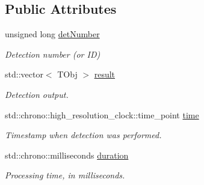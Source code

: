 \subsection*{Public Attributes}
\begin{DoxyCompactItemize}
\item 
\hypertarget{struct_vision_core_1_1_abstractions_1_1_detection_data_a73f468ab2fffab197d80d2e02abe86ac}{}unsigned long \hyperlink{struct_vision_core_1_1_abstractions_1_1_detection_data_a73f468ab2fffab197d80d2e02abe86ac}{det\+Number}\label{struct_vision_core_1_1_abstractions_1_1_detection_data_a73f468ab2fffab197d80d2e02abe86ac}

\begin{DoxyCompactList}\small\item\em Detection number (or I\+D) \end{DoxyCompactList}\item 
\hypertarget{struct_vision_core_1_1_abstractions_1_1_detection_data_ab01e2839a0bcd471d80ef46063083993}{}std\+::vector$<$ T\+Obj $>$ \hyperlink{struct_vision_core_1_1_abstractions_1_1_detection_data_ab01e2839a0bcd471d80ef46063083993}{result}\label{struct_vision_core_1_1_abstractions_1_1_detection_data_ab01e2839a0bcd471d80ef46063083993}

\begin{DoxyCompactList}\small\item\em Detection output. \end{DoxyCompactList}\item 
\hypertarget{struct_vision_core_1_1_abstractions_1_1_detection_data_af19c07021635b43df099e62283c93341}{}std\+::chrono\+::high\+\_\+resolution\+\_\+clock\+::time\+\_\+point \hyperlink{struct_vision_core_1_1_abstractions_1_1_detection_data_af19c07021635b43df099e62283c93341}{time}\label{struct_vision_core_1_1_abstractions_1_1_detection_data_af19c07021635b43df099e62283c93341}

\begin{DoxyCompactList}\small\item\em Timestamp when detection was performed. \end{DoxyCompactList}\item 
\hypertarget{struct_vision_core_1_1_abstractions_1_1_detection_data_a9c26a1638f116d3c0fba3f9342d67af1}{}std\+::chrono\+::milliseconds \hyperlink{struct_vision_core_1_1_abstractions_1_1_detection_data_a9c26a1638f116d3c0fba3f9342d67af1}{duration}\label{struct_vision_core_1_1_abstractions_1_1_detection_data_a9c26a1638f116d3c0fba3f9342d67af1}

\begin{DoxyCompactList}\small\item\em Processing time, in milliseconds. \end{DoxyCompactList}\end{DoxyCompactItemize}


